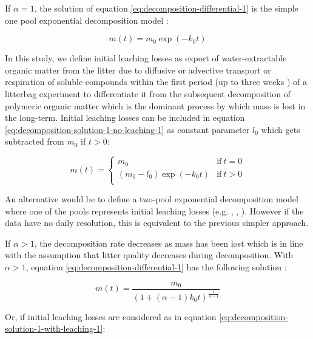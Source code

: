 \documentclass[bg, manuscript]{copernicus}
\begin{document}
If \(\alpha = 1\), the solution of equation \eqref{eq:decomposition-differential-1} is the simple one pool exponential decomposition model \citep{Frolking.2001}:

\begin{equation}
m(t) = m_0 \exp(-k_0 t)
\label{eq:decomposition-solution-1-no-leaching-1}
\end{equation}

In this study, we define initial leaching losses as export of water-extractable organic matter from the litter due to diffusive or advective transport or respiration of soluble compounds within the first period (up to three weeks \citep{Coulson.1978, Thormann.2001, Moore.2001, Kim.2014, Muller.2023}) of a litterbag experiment to differentiate it from the subsequent decomposition of polymeric organic matter which is the dominant process by which mass is lost in the long-term. Initial leaching losses can be included in equation \eqref{eq:decomposition-solution-1-no-leaching-1} as constant parameter \(l_0\) which gets subtracted from \(m_0\) if \(t>0\):

\begin{equation}
m(t) = \begin{cases}
m_0 & \mathrm{if}~t=0\\
(m_0 - l_0) \exp(-k_0 t) & \mathrm{if}~t>0\\
\end{cases}
\label{eq:decomposition-solution-1-with-leaching-1}
\end{equation}

An alternative would be to define a two-pool exponential decomposition model where one of the pools represents initial leaching losses (e.g. \citet{Yu.2001}, \citet{Rovira.2010}, \citet{Hagemann.2015}). However if the data have no daily resolution, this is equivalent to the previous simpler approach.

If \(\alpha>1\), the decomposition rate decreases as mass has been lost which is in line with the assumption that litter quality decreases during decomposition. With \(\alpha>1\), equation \eqref{eq:decomposition-differential-1} has the following solution \citep{Frolking.2001}:

\begin{equation}
m(t) = \frac{m_0}{(1 + (\alpha - 1) k_0 t)^{\frac{1}{\alpha - 1}}}
\label{eq:decomposition-solution-2-no-leaching-1}
\end{equation}

Or, if initial leaching losses are considered as in equation \eqref{eq:decomposition-solution-1-with-leaching-1}:
\end{document}
